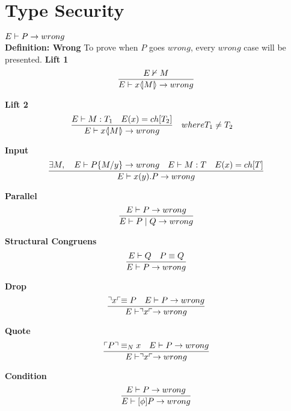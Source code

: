 \section{Type Security}

\begin{theorem}[Wrong]
\ensuremath{E \vdash P \ra wrong} \\
\textbf{Definition: Wrong}
To prove when \ensuremath{P} goes \ensuremath{wrong}, every \ensuremath{wrong} case will be presented.
\textbf{Lift 1} \begin{align*}
\frac{E \nvdash M}{E \vdash x \langle \! | M | \! \rangle \rightarrow wrong}
\end{align*}

\textbf{Lift 2} \begin{align*}
\frac{E \vdash M:T_1 \quad E(x)=ch[T_2]}{E \vdash x \langle \! | M | \! \rangle \rightarrow wrong} &\quad where T_1 \neq T_2
\end{align*}

\textbf{Input} \begin{align*}
\frac{\exists M,\quad E \vdash P\{ M/ y\} \rightarrow wrong \quad E \vdash M:T \quad E(x)= ch[T]} {E \vdash x(y).P \rightarrow wrong}\\
\end{align*}

\textbf{Parallel} \begin{align*}
\frac{E \vdash P \rightarrow wrong}{E \vdash P \mid Q \rightarrow wrong}
\end{align*}

\textbf{Structural Congruens} \begin{align*}
\frac{E \vdash Q \quad P \equiv Q}{E \vdash P \rightarrow wrong}
\end{align*}

\textbf{Drop}\begin{align*}
\frac{\urcorner x \ulcorner \equiv P \quad E \vdash P \rightarrow wrong}{E \vdash \urcorner x \ulcorner \rightarrow wrong}
\end{align*}

\textbf{Quote}\begin{align*}
\frac{\ulcorner P \urcorner \equiv _N x \quad E \vdash P \rightarrow wrong}{E \vdash \urcorner x \ulcorner \rightarrow wrong}
\end{align*}

\textbf{Condition}\begin{align*}
\frac{E \vdash P \rightarrow wrong}{E \vdash [\phi]P \rightarrow wrong}
\end{align*}


\end{theorem}

